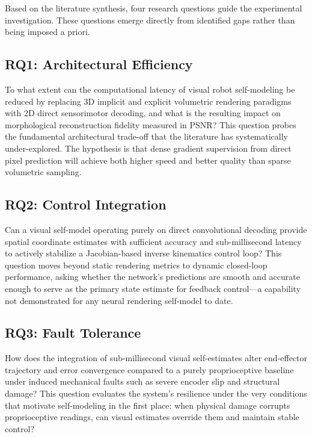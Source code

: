 \documentclass[12pt,a4paper,oneside]{report}
\begin{document}
Based on the literature synthesis, four research questions guide the experimental investigation. These questions emerge directly from identified gaps rather than being imposed a priori.

\subsection{RQ1: Architectural Efficiency}

To what extent can the computational latency of visual robot self-modeling be reduced by replacing 3D implicit and explicit volumetric rendering paradigms with 2D direct sensorimotor decoding, and what is the resulting impact on morphological reconstruction fidelity measured in PSNR? This question probes the fundamental architectural trade-off that the literature has systematically under-explored. The hypothesis is that dense gradient supervision from direct pixel prediction will achieve both higher speed and better quality than sparse volumetric sampling.

\subsection{RQ2: Control Integration}

Can a visual self-model operating purely on direct convolutional decoding provide spatial coordinate estimates with sufficient accuracy and sub-millisecond latency to actively stabilize a Jacobian-based inverse kinematics control loop? This question moves beyond static rendering metrics to dynamic closed-loop performance, asking whether the network's predictions are smooth and accurate enough to serve as the primary state estimate for feedback control---a capability not demonstrated for any neural rendering self-model to date.

\subsection{RQ3: Fault Tolerance}

How does the integration of sub-millisecond visual self-estimates alter end-effector trajectory and error convergence compared to a purely proprioceptive baseline under induced mechanical faults such as severe encoder slip and structural damage? This question evaluates the system's resilience under the very conditions that motivate self-modeling in the first place: when physical damage corrupts proprioceptive readings, can visual estimates override them and maintain stable control?
\end{document}
